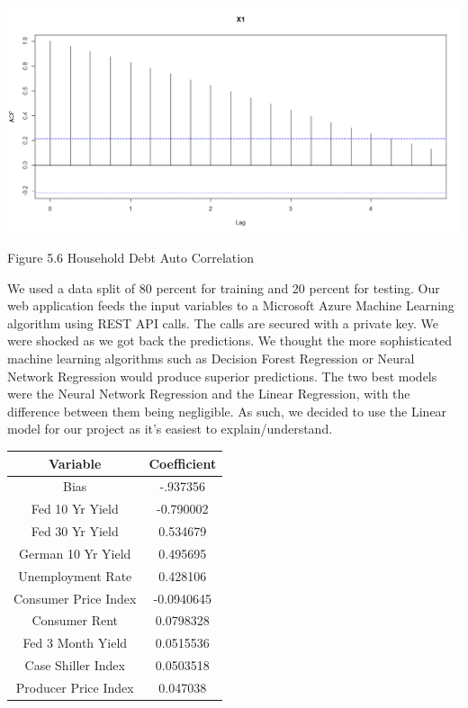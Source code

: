 \documentclass[sigconf,nonacm,11pt]{acmart}
\begin{document}
\vspace{0.5em}
\includegraphics[scale = 0.18]{HouseholdDebtAutoCor.png}

Figure 5.6 Household Debt Auto Correlation
\vspace{0.75em}

We used a data split of 80 percent for training and 20 percent for testing. Our web application feeds the input variables to a Microsoft Azure Machine Learning algorithm using REST API calls. The calls are secured with a private key.  We were shocked as we got back the predictions.  We thought the more sophisticated machine learning algorithms such as Decision Forest Regression or Neural Network Regression would produce superior predictions. The two best models were the Neural Network Regression and the Linear Regression, with the difference between them being negligible.  As such, we decided to use the Linear model for our project as it's easiest to explain/understand.

\begin{center}
    \begin{tabular}{||c|c||}
    \hline
    Variable & Coefficient\\
    \hline\hline
    Bias & -.937356\\
    Fed 10 Yr Yield & -0.790002\\
    Fed 30 Yr Yield & 0.534679\\
    German 10 Yr Yield & 0.495695\\
    Unemployment Rate & 0.428106\\
    Consumer Price Index & -0.0940645\\
    Consumer Rent & 0.0798328\\
    Fed 3 Month Yield & 0.0515536\\
    Case Shiller Index & 0.0503518\\
    Producer Price Index & 0.047038\\
    \hline
    \end{tabular}
\end{center}
\end{document}
